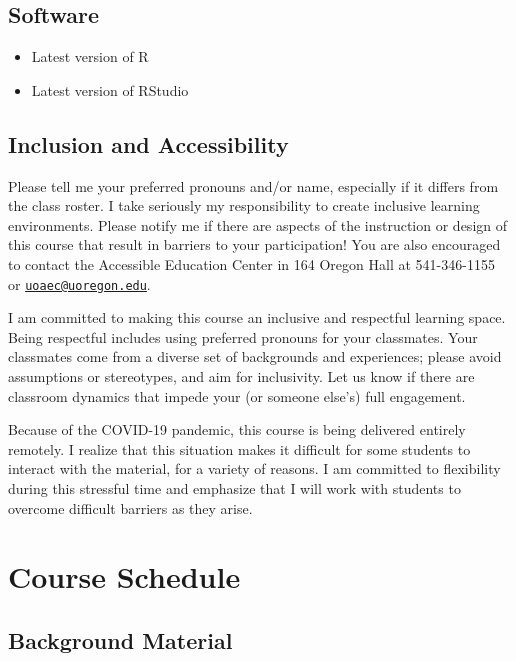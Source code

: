 \documentclass[
]{book}
\begin{document}
\hypertarget{software}{%
\section{Software}\label{software}}

\begin{itemize}
\item
  Latest version of R
\item
  Latest version of RStudio
\end{itemize}

\hypertarget{inclusion-and-accessibility}{%
\section{Inclusion and Accessibility}\label{inclusion-and-accessibility}}

Please tell me your preferred pronouns and/or name, especially if it differs from the class roster. I take seriously my responsibility to create inclusive learning environments. Please notify me if there are aspects of the instruction or design of this course that result in barriers to your participation! You are also encouraged to contact the Accessible Education Center in 164 Oregon Hall at 541-346-1155 or \href{mailto:uoaec@uoregon.edu}{\nolinkurl{uoaec@uoregon.edu}}.

I am committed to making this course an inclusive and respectful learning space. Being respectful includes using preferred pronouns for your classmates. Your classmates come from a diverse set of backgrounds and experiences; please avoid assumptions or stereotypes, and aim for inclusivity. Let us know if there are classroom dynamics that impede your (or someone else's) full engagement.

Because of the COVID-19 pandemic, this course is being delivered entirely remotely. I realize that this situation makes it difficult for some students to interact with the material, for a variety of reasons. I am committed to flexibility during this stressful time and emphasize that I will work with students to overcome difficult barriers as they arise.

\hypertarget{course-schedule}{%
\chapter{Course Schedule}\label{course-schedule}}

\hypertarget{background-material}{%
\section{Background Material}\label{background-material}}
\end{document}
